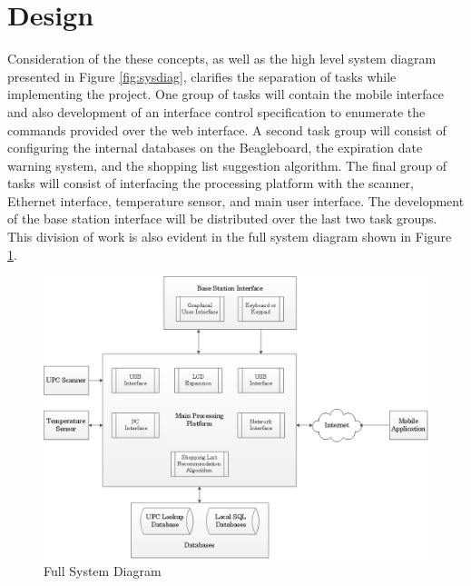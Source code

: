 \documentclass[11pt]{article} %
\begin{document}
\section{Design}
Consideration of the these concepts, as well as the high level system diagram presented in Figure \ref{fig:sysdiag}, clarifies the separation of tasks while implementing the project. One group of tasks will contain the mobile interface and also development of an interface control specification to enumerate the commands provided over the web interface. A second task group will consist of configuring the internal databases on the Beagleboard, the expiration date warning system, and the shopping list suggestion algorithm. The final group of tasks will consist of interfacing the processing platform with the scanner, Ethernet interface, temperature sensor, and main user interface. The development of the base station interface will be distributed over the last two task groups. This division of work is also evident in the full system diagram shown in Figure \ref{fig:fullsys}.
\begin{figure}[h!]
\vspace{0.5cm}
\begin{center}
\includegraphics[scale=0.4]{../Graphics/FullSystemDiagram}
\caption{Full System Diagram}
\label{fig:fullsys}
\end{center}
\end{figure}
\newline \quad \newline
\end{document}
